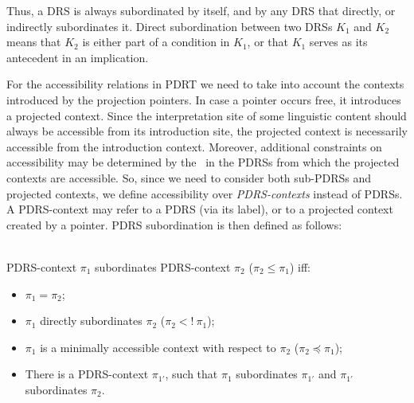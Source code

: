 \noindent Thus, a DRS is always subordinated by itself, and by any DRS that
directly, or indirectly subordinates it. Direct subordination between two
DRSs $K_1$ and $K_2$ means that $K_2$ is either part of a condition in
$K_1$, or that $K_1$ serves as its antecedent in an implication.

For the accessibility relations in PDRT we need to take into account the
contexts introduced by the projection pointers.  In case a pointer occurs
free, it introduces a projected context. Since the interpretation site of
some linguistic content should always be accessible from its introduction
site, the projected context is necessarily accessible from the introduction
context. Moreover, additional constraints on accessibility may be determined
by the \MAPs~in the PDRSs from which the projected contexts are accessible.
So, since we need to consider both sub-PDRSs and projected contexts, we
define accessibility over \textit{PDRS-contexts} instead of PDRSs.
A PDRS-context may refer to a PDRS (via its label), or to a projected
context created by a pointer. PDRS subordination is then defined as follows:

\begin{definition}\label{def:PDRSsub}~\\
PDRS-context $\pi_1$ subordinates PDRS-context $\pi_2$ ($\pi_2 \leq \pi_1$)
iff:
\begin{itemize}
  \item $\pi_1 = \pi_2$;
  \item $\pi_1$ directly subordinates $\pi_2$ ($\pi_2 <!~\pi_1$);
  \item $\pi_1$ is a minimally accessible context with respect to $\pi_2$
    ($\pi_2 \preceq \pi_1$);    
  \item There is a PDRS-context $\pi_{1'}$, such that $\pi_1$ subordinates
    $\pi_{1'}$ and $\pi_{1'}$ subordinates $\pi_2$.
\end{itemize}
\end{definition}

